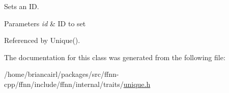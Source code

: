 Sets an I\-D. 


\begin{DoxyParams}{Parameters}
{\em id} & I\-D to set \\
\hline
\end{DoxyParams}


Referenced by Unique().



The documentation for this class was generated from the following file\-:\begin{DoxyCompactItemize}
\item 
/home/briancairl/packages/src/ffnn-\/cpp/ffnn/include/ffnn/internal/traits/\hyperlink{unique_8h}{unique.\-h}\end{DoxyCompactItemize}

